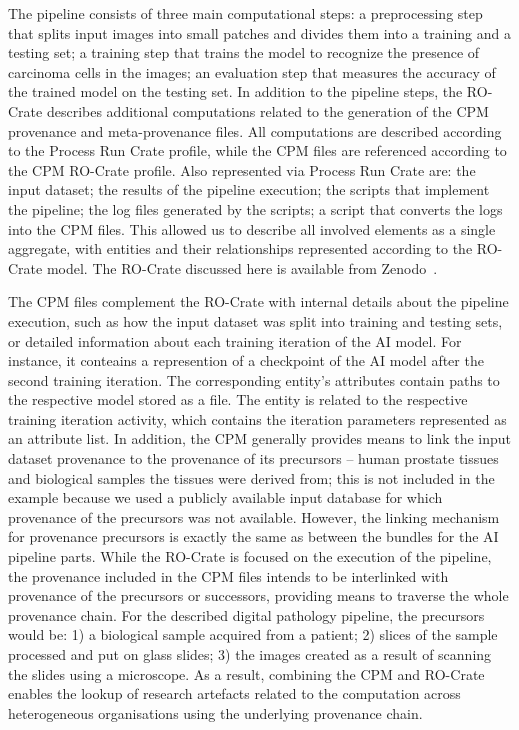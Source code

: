 \documentclass[10pt,letterpaper]{article}
\begin{document}
The pipeline consists of three main computational steps: a preprocessing step that splits input images into small patches and divides them into a training and a testing set; a training step that trains the model to recognize the presence of carcinoma cells in the images; an evaluation step that measures the accuracy of the trained model on the testing set.
In addition to the pipeline steps, the RO-Crate describes additional computations related to the generation of the CPM provenance and meta-provenance files.
All computations are described according to the Process Run Crate profile, while the CPM files are referenced according to the CPM RO-Crate profile. 
Also represented via Process Run Crate are: the input dataset; the results of the pipeline execution; the scripts that implement the pipeline; the log files generated by the scripts; a script that converts the logs into the CPM files.
This allowed us to describe all involved elements as a single aggregate, with entities and their relationships represented according to the RO-Crate model.
The RO-Crate discussed here is available from Zenodo~\cite{Wittner 2023a}.

The CPM files complement the RO-Crate with internal details about the pipeline execution, such as how the input dataset was split into training and testing sets, or detailed information about each training iteration of the AI model.
For instance, it conteains a represention of a checkpoint of the AI model after the second training iteration.
The corresponding entity's attributes contain paths to the respective model stored as a file.
The entity is related to the respective training iteration activity, which contains the iteration parameters represented as an attribute list.
In addition, the CPM generally provides means to link the input dataset provenance to the provenance of its precursors -- human prostate tissues and biological samples the tissues were derived from; this is not included in the example because we used a publicly available input database for which provenance of the precursors was not available.
However, the linking mechanism for provenance precursors is exactly the same as between the bundles for the AI pipeline parts.
While the RO-Crate is focused on the execution of the pipeline, the provenance included in the CPM files intends to be interlinked with provenance of the precursors or successors, providing means to traverse the whole provenance chain.
For the described digital pathology pipeline, the precursors would be: 1) a biological sample acquired from a patient; 2) slices of the sample processed and put on glass slides; 3) the images created as a result of scanning the slides using a microscope.
As a result, combining the CPM and RO-Crate enables the lookup of research artefacts related to the computation across heterogeneous organisations using the underlying provenance chain.
\end{document}
